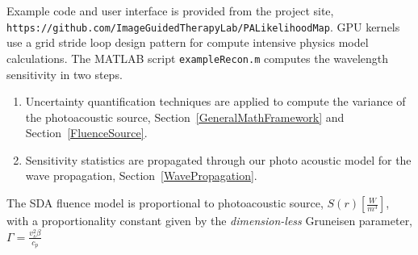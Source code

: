 \documentclass{article}         %
\theoremstyle{definition}
\theoremstyle{remark}
\begin{document}
Example code and user interface is provided from the project site,\\
\texttt{https://github.com/ImageGuidedTherapyLab/PALikelihoodMap}.
GPU kernels use a grid stride loop design pattern for compute intensive
physics model calculations.
The MATLAB script \texttt{exampleRecon.m} computes the wavelength
sensitivity in two steps.
\begin{enumerate}
\item
Uncertainty quantification techniques are applied to compute the variance
of the photoacoustic source,
Section~\ref{GeneralMathFramework} and Section~\ref{FluenceSource}.
\item  Sensitivity statistics are propagated through our photo acoustic
model for the wave propagation, Section~\ref{WavePropagation}.
\end{enumerate}
The SDA fluence model is  proportional to 
photoacoustic source,  $S(r) \left[\frac{W}{m^3}\right]$, 
with a proportionality constant given by the \textit{dimension-less}
Gruneisen parameter, $\Gamma = \frac{v_s^2 \beta}{c_p} $ \\
\end{document}
